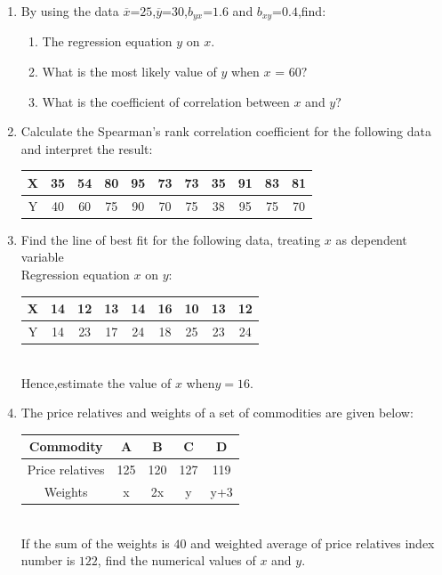 \documentclass[12pt,-letter paper]{article}
\begin{document}
\begin{enumerate}
	\item By using the data $\overline{x}$=$25$,$\overline{y}$=$30$,$b_{yx}$=$1.6$ and $b_{xy}$=$0.4$,find:
		\begin{enumerate}
	\item The regression equation $y$ on $x$. 
  \item What is the most likely value of $y$ when $x$ = $60?$ 
  \item What is the coefficient of correlation between $x$ and $y?$
\end{enumerate}
	\item Calculate the Spearman's rank correlation coefficient for the following data and interpret the result: \\
		\begin{tabular}{|c|c|c|c|c|c|c|c|c|c|c|}
	\hline
			X & 35 & 54 & 80 & 95 & 73 & 73 & 35 & 91 & 83 & 81\\
  \hline				       	       Y & 40 & 60 & 75 & 90 & 70 & 75 & 38 & 95 & 75 & 70\\
					       \hline
					              \end{tabular}
	\item Find the line of best fit for the following data, treating $x$ as dependent variable \\
		Regression equation $x$ on $y$: \\
\begin{tabular}{|c|c|c|c|c|c|c|c|c|}
			\hline
	X & 14 & 12 & 13 & 14  & 16 & 10 & 13 & 12\\
	\hline
Y & 14 & 23 & 17 & 24 & 18 & 25 & 23 & 24\\		\hline
					              \end{tabular} \\
						      Hence,estimate the value of $x$ when$y=16$.
					      \item The price relatives and weights of a set of commodities are given below: \\
						       \begin{tabular}{|c|c|c|c|c|}
							       \hline
	Commodity& A & B & C & D\\
								       \hline		
							Price relatives & 125 & 120 & 127 & 119\\
									       \hline
									Weights & x & 2x &y & y+3\\
									\hline
	        \end{tabular} \\
If the sum of the weights is $40$ and weighted average of price relatives index number is $122$, find the numerical values of $x$ and $y$.

\end{enumerate}
\end{document}
